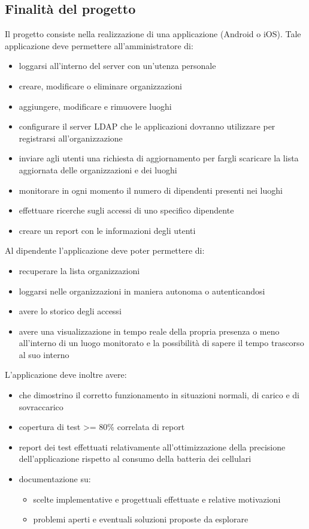 \documentclass[../studio-di-fattibilita.tex]{subfiles}
\begin{document}
\subsection{Finalità del progetto}%
\label{sub:finalita_del_progetto}
Il progetto consiste nella realizzazione di una applicazione (Android o iOS). Tale applicazione deve permettere all'amministratore di:
\begin{itemize}
  \item loggarsi all'interno del server con un'utenza personale
  \item creare, modificare o eliminare organizzazioni
  \item aggiungere, modificare e rimuovere luoghi
  \item configurare il server LDAP che le applicazioni dovranno utilizzare per registrarsi all'organizzazione
  \item inviare agli utenti una richiesta di aggiornamento per fargli scaricare la lista aggiornata delle organizzazioni e dei luoghi
  \item monitorare in ogni momento il numero di dipendenti presenti nei luoghi
  \item effettuare ricerche sugli accessi di uno specifico dipendente
  \item creare un report con le informazioni degli utenti
\end{itemize}
Al dipendente l'applicazione deve poter permettere di:
\begin{itemize}
  \item recuperare la lista organizzazioni
  \item loggarsi nelle organizzazioni in maniera autonoma o autenticandosi
  \item avere lo storico degli accessi
  \item avere una visualizzazione in tempo reale della propria presenza o meno all'interno di un luogo monitorato e la possibilità di sapere il tempo trascorso al suo interno
\end{itemize}
L'applicazione deve inoltre avere:
\begin{itemize}
  \item {} che dimostrino il corretto funzionamento in situazioni normali, di carico e di sovraccarico
  \item copertura di test >= 80\% correlata di report
  \item report dei test effettuati relativamente all'ottimizzazione della precisione dell'applicazione rispetto al consumo della batteria dei cellulari
  \item documentazione su:
  \begin{itemize}
    \item scelte implementative e progettuali effettuate e relative motivazioni
    \item problemi aperti e eventuali soluzioni proposte da esplorare
  \end{itemize}
\end{itemize}
\end{document}
